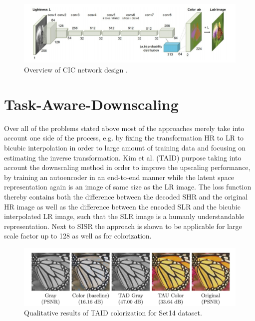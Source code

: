 \begin{figure}[!htbp]
	\centering
	\includegraphics[width=14cm]{figures/cic}
	\caption{Overview of CIC network design \cite{CIC}.}
  \label{fig:cic}
\end{figure}

\section{Task-Aware-Downscaling}
Over all of the problems stated above most of the approaches merely take into account one side of the process, e.g. by fixing the transformation HR to LR to bicubic interpolation in order to large amount of training data and focusing on estimating the inverse transformation. Kim et al. \cite{TAID} (TAID) purpose taking into account the downscaling method in order to improve the upscaling performance, by training an autoencoder in an end-to-end manner while the latent space representation again is an image of same size as the LR image. The loss function thereby contains both the difference between the decoded SHR and the original HR image as well as the difference between the encoded SLR and the bicubic interpolated LR image, such that the SLR image is a humanly understandable
representation. Next to SISR the approach is shown to be applicable for large scale factor up to 128 as well as for colorization.

\begin{figure}[!htbp]
	\centering
	\includegraphics[width=14cm]{figures/taid_colorization}
	\caption{Qualitative results of TAID colorization for Set14 dataset.}
  \label{fig:taid_colorization}
\end{figure}

%
